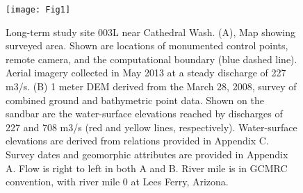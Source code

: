 \graphicspath{{003L/input/}}


\renewcommand{\thefigure}{003L---D\arabic{figure}}
\setcounter{figure}{0}


\begin{figure}[H]
	\centering
	\texttt{[image: Fig1]}
	\caption{Long-term study site 003L near Cathedral Wash.  (A), Map showing surveyed area.  Shown are locations of monumented control points, remote camera, and the computational boundary (blue dashed line).  Aerial imagery collected in May 2013 at a steady discharge of 227 m3/s.  (B) 1 meter DEM derived from the March 28, 2008, survey of combined ground and bathymetric point data.  Shown on the sandbar are the water-surface elevations reached by discharges of 227 and 708 m3/s (red and yellow lines, respectively).  Water-surface elevations are derived from relations provided in Appendix C.  Survey dates and geomorphic attributes are provided in Appendix A.  Flow is right to left in both A and B.  River mile is in GCMRC convention, with river mile 0 at Lees Ferry, Arizona.}
\end{figure}


